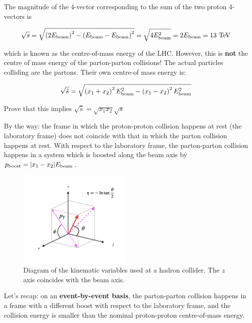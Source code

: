 The magnitude of the 4-vector corresponding to the sum of the two proton 4-vectors is 

\begin{align}
\sqrt{s} = \sqrt{\left(2E_{\mathrm{beam}}\right)^2 - \left(E_{\mathrm{beam}}-E_{\mathrm{beam}}\right)^2} = \sqrt{4E_{\mathrm{beam}}^2} = 2E_{\mathrm{beam}} = 13\ \text{Te\kern -0.1em V}
\end{align}

\noindent which is known as the centre-of-mass energy of the LHC. However, this is \textbf{not} the centre of mass energy of the parton-parton collisions! The actual particles colliding are the partons. Their own centre-of mass energy is:

\begin{align*}
\sqrt{\hat{s}} = \sqrt{\left( x_1 + x_2 \right) ^2 E_{\mathrm{beam}}^2 - \left( x_1 - x_2\right)^2 E_{\mathrm{beam}}^2}
\end{align*}

\begin{exercise}
Prove that this implies $\sqrt{\hat{s}} = \sqrt{x_1 x_2} \sqrt{s}$
\end{exercise}

By the way: the frame in which the proton-proton collision happens at rest (the laboratory frame) does not coincide with that in which the parton collision happens at rest. With respect to the laboratory frame, the parton-parton collision happens in a system which is boosted along the beam axis by $p_{\mathrm{boost}} = |x_1-x_2| E_{\mathrm{beam}}$.

 \begin{figure}[!h]
\begin{center}
\includegraphics[width=0.5\textwidth]{./Figures/collider_physics_variables.png}
\end{center}
\caption{Diagram of the kinematic variables used at a hadron collider. The $z$ axis coincides with the beam axis.}
\label{fig:collider_variables}
\end{figure}


Let's recap: on an \textbf{event-by-event basis}, the parton-parton collision happens in a frame with a different boost with respect to the laboratory frame, and the collision energy is smaller than the nominal proton-proton centre-of-mass energy. 

